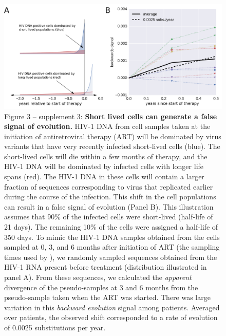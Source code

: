 \documentclass[aps,rmp,onecolumn,linenumbers]{revtex4-1}
\begin{document}
\begin{figure}[hb]
\centering
\includegraphics[width=0.7\columnwidth]{figures/fig3_S3}
\caption{Figure 3 -- supplement 3: {\bf Short lived cells can generate a false signal of evolution.} HIV-1 DNA from cell samples taken at the initiation of antiretroviral therapy (ART) will be dominated by virus variants that have very recently infected short-lived cells (blue). The short-lived cells will die within a few months of therapy, and the HIV-1 DNA will be dominated by infected cells with longer life spans (red). The HIV-1 DNA in these cells will contain a larger fraction of sequences corresponding to virus that replicated earlier during the course of the infection. This shift in the cell populations can result in a false signal of evolution (Panel B). This illustration assumes that 90\% of the infected cells were short-lived (half-life of 21 days). The remaining 10\% of the cells were assigned a half-life of 350 days. 
To mimic the HIV-1 DNA samples obtained from the cells sampled at 0, 3, and 6 months after initiation of ART (the sampling times used by \citet{lorenzo-redondo_persistent_2016}), we randomly sampled sequences obtained from the HIV-1 RNA present before treatment (distribution illustrated in panel A). From these sequences, we calculated the \emph{apparent} divergence of the pseudo-samples at 3 and 6 months from the pseudo-sample taken when the ART was started.
There was large variation in this \emph{backward evolution} signal among patients. Averaged over patients, the observed shift corresponded to a rate of evolution of 0.0025 substitutions per year.}
\label{fig:backward}
\end{figure}
\end{document}
